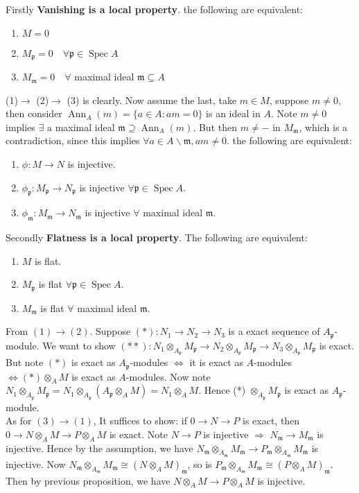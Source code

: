 \documentclass[12pt]{article}
\theoremstyle{definition}
\theoremstyle{plain}
\DeclareMathOperator{\Spec}{Spec}
\DeclareMathOperator{\Ann}{Ann}
\begin{document}
\medskip
Firstly \textbf{Vanishing is a local property}.
\Prop the following are equivalent:
\begin{enumerate}
  \item $M=0$
  \item $M_\mathfrak{p}=0 \quad\forall \mathfrak{p}\in \Spec A$
  \item $M_\mathfrak{m}=0 \quad \forall$ maximal ideal $\mathfrak{m}\subseteq A$
\end{enumerate}
\proof (1)$\to$ (2)$\to$ (3) is clearly. Now assume the last, take $m\in M$, suppose $m\neq 0$, then consider $\Ann_A(m)=\{a\in A:am=0\}$ is an ideal in $A$. Note $m\neq 0$ implies $\exists$ a maximal ideal $\mathfrak{m}\supseteq \Ann_A(m)$. But then $m\neq-$ in $M_\mathfrak{m}$, which is  a contradiction, since this implies $\forall a\in A\backslash \mathfrak{m}, am\neq 0$.
\Cor the following are equivalent:
\begin{enumerate}
  \item $\phi:M\to N$ is injective.
  \item $\phi_\mathfrak{p}: M_\mathfrak{p}\to N_\mathfrak{p}$ is injective $\forall \mathfrak{p} \in \Spec A$.
  \item $\phi_\mathfrak{m}: M_\mathfrak{m}\to N_\mathfrak{m}$ is injective $\forall$ maximal ideal $\mathfrak{m}$.
\end{enumerate}

\medskip
Secondly \textbf{Flatness is a local property}.
\Prop The following are equivalent:
\begin{enumerate}
  \item $M$ is flat.
  \item $M_\mathfrak{p}$ is flat $\forall \mathfrak{p}\in \Spec A$.
  \item $M_\mathfrak{m}$ is flat $\forall$ maximal ideal $\mathfrak{m}$.
\end{enumerate}
\proof From $(1)\to (2)$. Suppose $(*):N_1\to N_2\to N_3$ is a exact sequence of $A_\mathfrak{p}$-module. We want to show $(**):N_1\otimes_{A_\mathfrak{p}}M_\mathfrak{p}\to N_2 \otimes_{A_\mathfrak{p}}M_\mathfrak{p}\to N_3\otimes_{A_\mathfrak{p}}M_\mathfrak{p}$ is exact. But note $(*)$ is exact as $A_\mathfrak{p}$-modules $\iff$ it is exact as $A$-modules $\iff (*) \otimes_A M$ is exact as $A$-modules. Now note $N_1\otimes_{A_\mathfrak{p}}M_\mathfrak{p}=N_1\otimes_{A_\mathfrak{p}}(A_\mathfrak{p}\otimes_A M)=N_1\otimes_A M$. Hence (*) $\otimes_{A_\mathfrak{p}} M_\mathfrak{p}$ is exact as $A_\mathfrak{p}$-module.\\
As for $(3)\to (1)$, It suffices to show: if $0\to N\to P$ is exact, then $0\to N\otimes_A M\to P\otimes_A M$ is exact. Note $N\to P$ is injective $\Rightarrow$ $N_\mathfrak{m}\to M_\mathfrak{m}$ is injective. Hence by the assumption, we have $N_\mathfrak{m}\otimes_{A_\mathfrak{m}}M_\mathfrak{m}\to P_\mathfrak{m}\otimes_{A_\mathfrak{m}}M_\mathfrak{m}$ is injective. Now $N_\mathfrak{m}\otimes_{A_\mathfrak{m}}M_\mathfrak{m}\cong (N\otimes_A M)_\mathfrak{m}$, so is $P_\mathfrak{m}\otimes_{A_\mathfrak{m}}M_\mathfrak{m}\cong (P\otimes_A M)_\mathfrak{m}$. Then by previous proposition, we have $N\otimes_A M\to P\otimes_A M$ is injective. \qedhere
\end{document}
